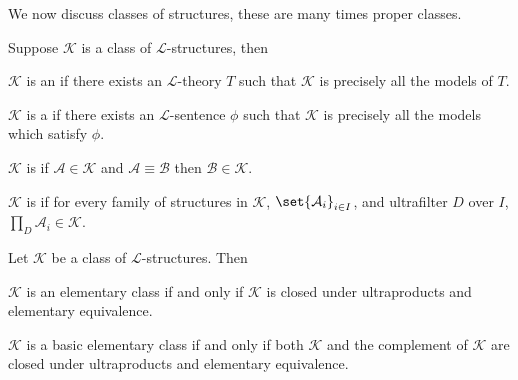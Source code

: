 \documentclass[10pt]{article}
\def\mA{\mathcal{A}}
\def\mB{\mathcal{B}}
\def\mL{\mathcal{L}}
\def\mK{\mathcal{K}}
\begin{document}
We now discuss classes of structures, these are many times proper classes.

\begin{defn*}

    Suppose $\mK$ is a class of $\mL$-structures, then
    \blist
        \item $\mK$ is an  if there exists an $\mL$-theory $T$ such that $\mK$ is precisely all the models of $T$.
        \item $\mK$ is a  if there exists an $\mL$-sentence $\phi$ such that $\mK$ is precisely all the models which satisfy $\phi$.
        \item $\mK$ is  if $\mA\in\mK$ and $\mA\equiv\mB$ then $\mB\in\mK$.
        \item $\mK$ is  if for every family of structures in $\mK$, $\set{\mA_i}_{i\in I}$, and ultrafilter $D$ over $I$, $\prod_D\mA_i\in\mK$.
    \elist

\end{defn*}

\begin{thrm*}

    Let $\mK$ be a class of $\mL$-structures.
    Then
    \benum
        \item $\mK$ is an elementary class if and only if $\mK$ is closed under ultraproducts and elementary equivalence.
        \item $\mK$ is a basic elementary class if and only if both $\mK$ and the complement of $\mK$ are closed under ultraproducts and elementary equivalence.
    \eenum

\end{thrm*}
\end{document}
